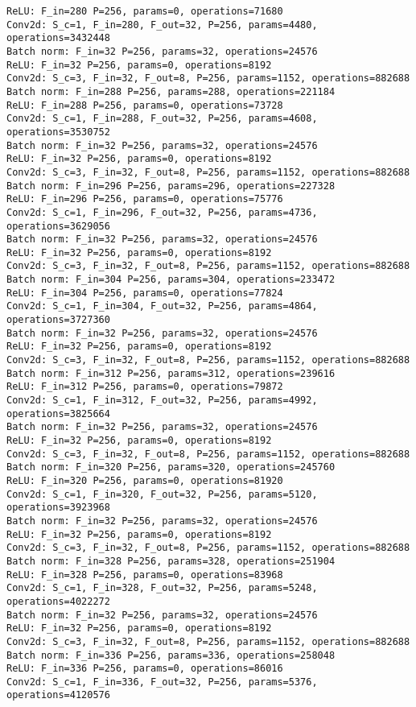 \begin{Verbatim}[fontsize=\small]
ReLU: F_in=280 P=256, params=0, operations=71680
Conv2d: S_c=1, F_in=280, F_out=32, P=256, params=4480, operations=3432448
Batch norm: F_in=32 P=256, params=32, operations=24576
ReLU: F_in=32 P=256, params=0, operations=8192
Conv2d: S_c=3, F_in=32, F_out=8, P=256, params=1152, operations=882688
Batch norm: F_in=288 P=256, params=288, operations=221184
ReLU: F_in=288 P=256, params=0, operations=73728
Conv2d: S_c=1, F_in=288, F_out=32, P=256, params=4608, operations=3530752
Batch norm: F_in=32 P=256, params=32, operations=24576
ReLU: F_in=32 P=256, params=0, operations=8192
Conv2d: S_c=3, F_in=32, F_out=8, P=256, params=1152, operations=882688
Batch norm: F_in=296 P=256, params=296, operations=227328
ReLU: F_in=296 P=256, params=0, operations=75776
Conv2d: S_c=1, F_in=296, F_out=32, P=256, params=4736, operations=3629056
Batch norm: F_in=32 P=256, params=32, operations=24576
ReLU: F_in=32 P=256, params=0, operations=8192
Conv2d: S_c=3, F_in=32, F_out=8, P=256, params=1152, operations=882688
Batch norm: F_in=304 P=256, params=304, operations=233472
ReLU: F_in=304 P=256, params=0, operations=77824
Conv2d: S_c=1, F_in=304, F_out=32, P=256, params=4864, operations=3727360
Batch norm: F_in=32 P=256, params=32, operations=24576
ReLU: F_in=32 P=256, params=0, operations=8192
Conv2d: S_c=3, F_in=32, F_out=8, P=256, params=1152, operations=882688
Batch norm: F_in=312 P=256, params=312, operations=239616
ReLU: F_in=312 P=256, params=0, operations=79872
Conv2d: S_c=1, F_in=312, F_out=32, P=256, params=4992, operations=3825664
Batch norm: F_in=32 P=256, params=32, operations=24576
ReLU: F_in=32 P=256, params=0, operations=8192
Conv2d: S_c=3, F_in=32, F_out=8, P=256, params=1152, operations=882688
Batch norm: F_in=320 P=256, params=320, operations=245760
ReLU: F_in=320 P=256, params=0, operations=81920
Conv2d: S_c=1, F_in=320, F_out=32, P=256, params=5120, operations=3923968
Batch norm: F_in=32 P=256, params=32, operations=24576
ReLU: F_in=32 P=256, params=0, operations=8192
Conv2d: S_c=3, F_in=32, F_out=8, P=256, params=1152, operations=882688
Batch norm: F_in=328 P=256, params=328, operations=251904
ReLU: F_in=328 P=256, params=0, operations=83968
Conv2d: S_c=1, F_in=328, F_out=32, P=256, params=5248, operations=4022272
Batch norm: F_in=32 P=256, params=32, operations=24576
ReLU: F_in=32 P=256, params=0, operations=8192
Conv2d: S_c=3, F_in=32, F_out=8, P=256, params=1152, operations=882688
Batch norm: F_in=336 P=256, params=336, operations=258048
ReLU: F_in=336 P=256, params=0, operations=86016
Conv2d: S_c=1, F_in=336, F_out=32, P=256, params=5376, operations=4120576

\end{Verbatim}
